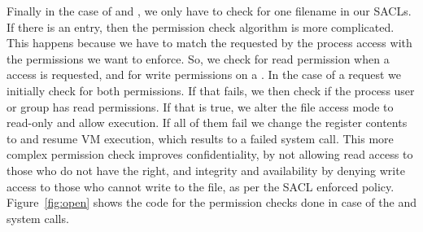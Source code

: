 \par Finally in the case of  and , we only have to check for one filename in our \ac{SACL}s. If there is an entry, then the permission check algorithm is more complicated. This happens because we have to match the requested by the process access  with the permissions we want to enforce. So, we check for read permission when a  access is requested, and for write permissions on a . In the case of a  request we initially check for both permissions. If that fails, we then check if the process user or group has read permissions. If that is true, we alter the file access mode to read-only and allow execution. If all of them fail we change the  register contents to  and resume \ac{VM} execution, which results to a failed system call. This more complex permission check improves confidentiality, by not allowing read access to those who do not have the right, and integrity and availability by denying write access to those who cannot write to the file, as per the \ac{SACL} enforced policy. Figure~\ref{fig:open} shows the code for the permission checks done in case of the  and  system calls.




